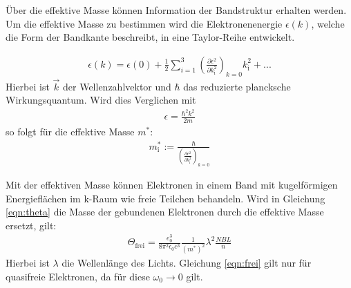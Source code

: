 Über die effektive Masse können Information der Bandstruktur erhalten werden.
Um die effektive Masse zu bestimmen wird die Elektronenenergie $\epsilon (k)$,
welche die Form der Bandkante beschreibt, in eine Taylor-Reihe entwickelt.

\begin{align}
  \epsilon(k) = \epsilon (0) + \frac{1}{2} \sum_{i=1}^3 \left(\frac{\partial \epsilon^2}{\partial k^2_{\mathrm{i}}}\right)_{k=0} k_{\mathrm{i}}^2 + ...
\end{align}
Hierbei ist $\vec{k}$ der Wellenzahlvektor und $\hbar$ das reduzierte plancksche Wirkungsquantum.
Wird dies Verglichen mit
\begin{align}
  \epsilon = \frac{\hbar^2 k^2}{2m}
\end{align}
so folgt für die effektive Masse $m^*$:
\begin{align}
  m^*_{\mathrm{i}} := \frac{\hbar}{\left(\frac{\partial \epsilon^2}{\partial k^2_{\mathrm{i}}}\right)_{k=0}}
\end{align}

Mit der effektiven Masse können Elektronen in einem Band mit kugelförmigen
Energieflächen im k-Raum wie freie Teilchen behandeln.
Wird in Gleichung \ref{eqn:theta} die Masse der gebundenen Elektronen durch die effektive Masse ersetzt, gilt:
\begin{align}
  \Theta_{\mathrm{frei}} = \frac{e^3_0}{8 \pi^2 \epsilon_0 c^3}\frac{1}{\left(m^{*}\right)^2} \lambda^2 \frac{NBL}{n} \label{eqn:frei}
\end{align}
Hierbei ist $\lambda$ die Wellenlänge des Lichts.
Gleichung \ref{eqn:frei} gilt nur für quasifreie Elektronen, da für diese $\omega_0 \rightarrow 0$ gilt.
